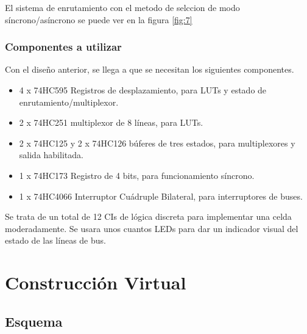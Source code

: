 \documentclass[12pt]{article}
\begin{document}
El sistema de enrutamiento con el metodo de selccion de modo síncrono/asíncrono se puede ver en la figura \ref{fig:7}
\subsubsection{Componentes a utilizar}

Con el diseño anterior, se llega a que se necesitan los siguientes componentes. 
 
\begin{itemize} 
  \item 4 x 74HC595 Registros de desplazamiento, para LUTs y estado de enrutamiento/multiplexor. 
  \item 2 x 74HC251 multiplexor de 8 líneas, para LUTs. 
  \item 2 x 74HC125 y 2 x 74HC126 búferes de tres estados, para multiplexores y salida habilitada. 
  \item 1 x 74HC173 Registro de 4 bits, para funcionamiento síncrono. 
  \item 1 x 74HC4066 Interruptor Cuádruple Bilateral, para interruptores de buses. 
\end{itemize} 
  
Se trata de un total de 12 CIs de lógica discreta para implementar una celda moderadamente. Se usara unos cuantos LEDs para dar un indicador visual del estado de las líneas de bus.

\section{Construcción Virtual}

\subsection{Esquema}
\end{document}
